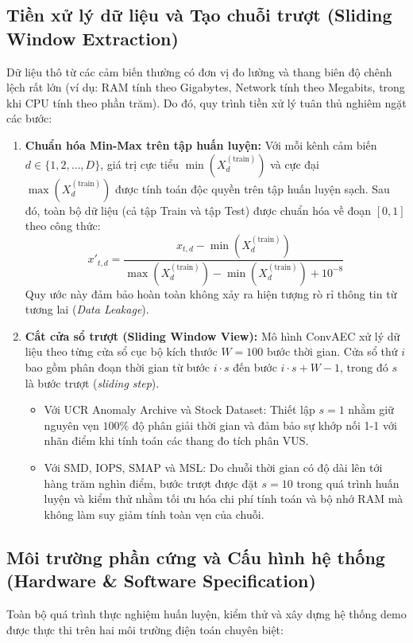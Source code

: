 \documentclass[11pt,journal,onecolumn]{IEEEtran}
\begin{document}
\subsection{Tiền xử lý dữ liệu và Tạo chuỗi trượt (Sliding Window Extraction)}
Dữ liệu thô từ các cảm biến thường có đơn vị đo lường và thang biên độ chênh lệch rất lớn (ví dụ: RAM tính theo Gigabytes, Network tính theo Megabits, trong khi CPU tính theo phần trăm). Do đó, quy trình tiền xử lý tuân thủ nghiêm ngặt các bước:
\begin{enumerate}
    \item \textbf{Chuẩn hóa Min-Max trên tập huấn luyện:}
    Với mỗi kênh cảm biến $d \in \{1, 2, \dots, D\}$, giá trị cực tiểu $\min(X_d^{(\text{train})})$ và cực đại $\max(X_d^{(\text{train})})$ được tính toán độc quyền trên tập huấn luyện sạch. Sau đó, toàn bộ dữ liệu (cả tập Train và tập Test) được chuẩn hóa về đoạn $[0, 1]$ theo công thức:
    \begin{equation}
    x'_{t, d} = \frac{x_{t, d} - \min(X_d^{(\text{train})})}{\max(X_d^{(\text{train})}) - \min(X_d^{(\text{train})}) + 10^{-8}}
    \end{equation}
    Quy ước này đảm bảo hoàn toàn không xảy ra hiện tượng rò rỉ thông tin từ tương lai (\textit{Data Leakage}).
    
    \item \textbf{Cắt cửa sổ trượt (Sliding Window View):}
    Mô hình ConvAEC xử lý dữ liệu theo từng cửa sổ cục bộ kích thước $W = 100$ bước thời gian. Cửa sổ thứ $i$ bao gồm phân đoạn thời gian từ bước $i \cdot s$ đến bước $i \cdot s + W - 1$, trong đó $s$ là bước trượt (\textit{sliding step}).
    \begin{itemize}
        \item Với UCR Anomaly Archive và Stock Dataset: Thiết lập $s = 1$ nhằm giữ nguyên vẹn $100\%$ độ phân giải thời gian và đảm bảo sự khớp nối 1-1 với nhãn điểm khi tính toán các thang đo tích phân VUS.
        \item Với SMD, IOPS, SMAP và MSL: Do chuỗi thời gian có độ dài lên tới hàng trăm nghìn điểm, bước trượt được đặt $s = 10$ trong quá trình huấn luyện và kiểm thử nhằm tối ưu hóa chi phí tính toán và bộ nhớ RAM mà không làm suy giảm tính toàn vẹn của chuỗi.
    \end{itemize}
\end{enumerate}

\subsection{Môi trường phần cứng và Cấu hình hệ thống (Hardware \& Software Specification)}
\label{subsec:hardware}
Toàn bộ quá trình thực nghiệm huấn luyện, kiểm thử và xây dựng hệ thống demo được thực thi trên hai môi trường điện toán chuyên biệt:
\end{document}
